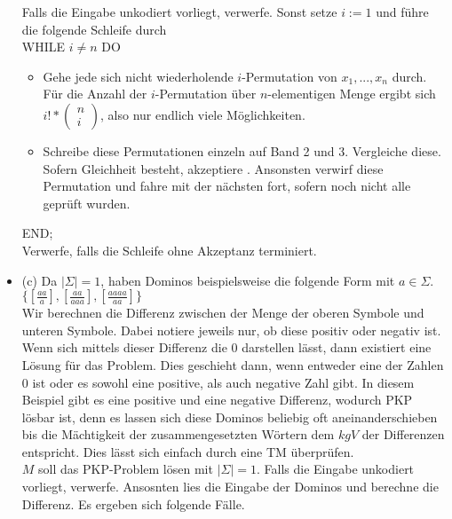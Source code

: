 \documentclass{article}
\begin{document}
\begin{itemize}
Falls die Eingabe unkodiert vorliegt, verwerfe. Sonst setze $ i:= 1$ und führe die folgende Schleife durch\\
WHILE $i \neq n$ DO\\
\begin{itemize}
\item Gehe jede sich nicht wiederholende $i$-Permutation von $x_1,...,x_n$ durch. Für die Anzahl der $i$-Permutation über $n$-elementigen Menge ergibt sich $i! * \begin{pmatrix}
n\\
i
\end{pmatrix}$, also nur endlich viele Möglichkeiten.
\item Schreibe diese Permutationen einzeln auf Band 2 und 3. Vergleiche diese. Sofern Gleichheit besteht, akzeptiere . Ansonsten verwirf diese Permutation und fahre mit der nächsten fort, sofern noch nicht alle geprüft wurden.
\end{itemize}

END;\\
Verwerfe, falls die Schleife ohne Akzeptanz terminiert.\\

\item (c) Da $\vert{\Sigma}\vert = 1$, haben Dominos beispielsweise die folgende Form mit $a \in \Sigma$.\\

	$\{[\frac{aa}{a}],[\frac{aa}{aaa}],[\frac{aaaa}{aa}]\}$\\
	
	Wir berechnen die Differenz zwischen der Menge der oberen Symbole und unteren Symbole. Dabei notiere jeweils nur, ob diese positiv oder negativ ist. Wenn sich mittels dieser Differenz die 0 darstellen lässt, dann existiert eine Lösung für das Problem. Dies geschieht dann, wenn entweder eine der Zahlen 0 ist oder es sowohl eine positive, als auch negative Zahl gibt. In diesem Beispiel gibt es eine positive und eine negative Differenz, wodurch PKP lösbar ist, denn es lassen sich diese Dominos beliebig oft aneinanderschieben bis die Mächtigkeit der zusammengesetzten Wörtern dem $kgV$ der Differenzen entspricht. Dies lässt sich einfach durch eine TM überprüfen.\\
	
	$M$ soll das PKP-Problem lösen mit $\vert \Sigma \vert  = 1$. Falls die Eingabe unkodiert vorliegt, verwerfe. Ansosnten lies die Eingabe der Dominos und berechne die Differenz. Es ergeben sich folgende Fälle.\\
	

\end{itemize}
\end{document}
